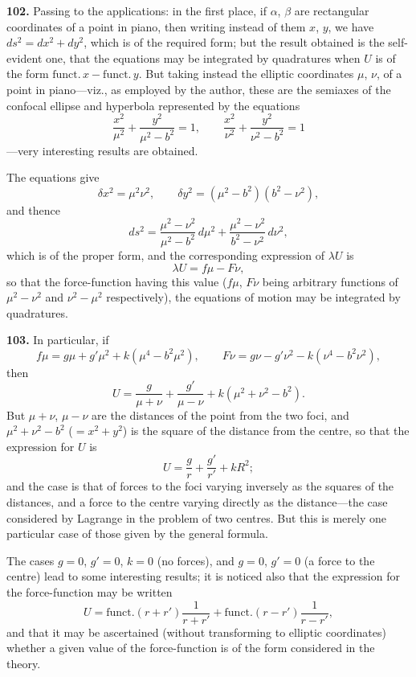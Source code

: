 \documentclass[11pt,a4paper]{article}
\theoremstyle{definition}
\begin{document}
\textbf{102.} Passing to the applications: in the first place, if $\alpha$, $\beta$ are rectangular coordinates of a point in piano, then writing instead of them $x$, $y$, we have $ds^2 = dx^2 + dy^2$, which is of the required form; but the result obtained is the self-evident one, that the equations may be integrated by quadratures when $U$ is of the form $\text{funct.}\,x - \text{funct.}\,y$. But taking instead the elliptic coordinates $\mu$, $\nu$, of a point in piano---viz., as employed by the author, these are the semiaxes of the confocal ellipse and hyperbola represented by the equations
\[
\frac{x^2}{\mu^2} + \frac{y^2}{\mu^2 - b^2} = 1, \qquad \frac{x^2}{\nu^2} + \frac{y^2}{\nu^2 - b^2} = 1
\]
---very interesting results are obtained.

The equations give
\[
\delta x^2 = \mu^2\nu^2, \qquad \delta y^2 = (\mu^2 - b^2)(b^2 - \nu^2),
\]
and thence
\[
ds^2 = \frac{\mu^2 - \nu^2}{\mu^2 - b^2}\,d\mu^2 + \frac{\mu^2 - \nu^2}{b^2 - \nu^2}\,d\nu^2,
\]
which is of the proper form, and the corresponding expression of $\lambda U$ is
\[
\lambda U = f\mu - F\nu,
\]
so that the force-function having this value ($f\mu$, $F\nu$ being arbitrary functions of $\mu^2 - \nu^2$ and $\nu^2 - \mu^2$ respectively), the equations of motion may be integrated by quadratures.

\textbf{103.} In particular, if
\[
f\mu = g\mu + g'\mu^2 + k(\mu^4 - b^2\mu^2), \qquad F\nu = g\nu - g'\nu^2 - k(\nu^4 - b^2\nu^2),
\]
then
\[
U = \frac{g}{\mu + \nu} + \frac{g'}{\mu - \nu} + k(\mu^2 + \nu^2 - b^2).
\]
But $\mu + \nu$, $\mu - \nu$ are the distances of the point from the two foci, and $\mu^2 + \nu^2 - b^2$ ($= x^2 + y^2$) is the square of the distance from the centre, so that the expression for $U$ is
\[
U = \frac{g}{r} + \frac{g'}{r'} + kR^2;
\]
and the case is that of forces to the foci varying inversely as the squares of the distances, and a force to the centre varying directly as the distance---the case considered by Lagrange in the problem of two centres. But this is merely one particular case of those given by the general formula.

The cases $g = 0$, $g' = 0$, $k = 0$ (no forces), and $g = 0$, $g' = 0$ (a force to the centre) lead to some interesting results; it is noticed also that the expression for the force-function may be written
\[
U = \text{funct.}(r + r') \frac{1}{r + r'} + \text{funct.}(r - r') \frac{1}{r - r'},
\]
and that it may be ascertained (without transforming to elliptic coordinates) whether a given value of the force-function is of the form considered in the theory.
\end{document}
